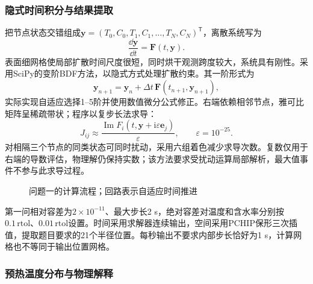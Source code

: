 \subsubsection{隐式时间积分与结果提取}
把节点状态交错组成$\bm y=(T_0,C_0,T_1,C_1,\ldots,T_N,C_N)^\mathsf T$，离散系统写为
\begin{equation}
\frac{\dd\bm y}{\dd t}=\bm F(t,\bm y).
\end{equation}
表面细网格使局部扩散时间尺度很短，同时烘干观测跨度较大，系统具有刚性。采用SciPy的变阶BDF方法\cite{scipy,shampine,bdfdocs}，以隐式方式处理扩散约束。其一阶形式为
\begin{equation}
\bm y_{n+1}=\bm y_n+\Delta t\,\bm F(t_{n+1},\bm y_{n+1}),
\end{equation}
实际实现自适应选择1--5阶并使用数值微分公式修正。右端依赖相邻节点，雅可比矩阵呈稀疏带状；程序以复步长法求导\cite{martins}：
\begin{equation}
J_{ij}\approx
\frac{\operatorname{Im}F_i(t,\bm y+\mathrm{i}\varepsilon\bm e_j)}
{\varepsilon},\qquad \varepsilon=10^{-25}.
\label{eq:complex}
\end{equation}
对相隔三个节点的同类状态可同时扰动，采用六组着色减少求导次数。复数仅用于右端的导数评估，物理解仍保持实数；该方法要求受扰动运算局部解析，最大值事件不参与此求导过程。

\begin{figure}[H]\centering
{}
\caption{问题一的计算流程；回路表示自适应时间推进}\label{fig:algorithm}
\end{figure}

第一问相对容差为$2\times10^{-11}$、最大步长2 s，绝对容差对温度和含水率分别按$0.1\,\mathrm{rtol}$、$0.01\,\mathrm{rtol}$设置。时间采用求解器连续输出，空间采用PCHIP保形三次插值\cite{fritsch,pchipdocs}，提取题目要求的21个半径位置。每秒输出不要求内部步长恰好为1 s，计算网格也不等同于输出位置网格。

\nextpage
\subsubsection{预热温度分布与物理解释}


